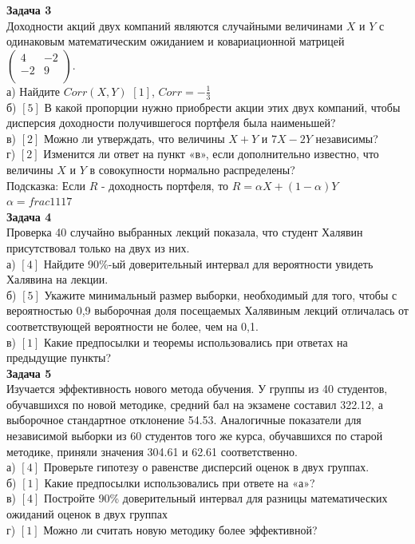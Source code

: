 \documentclass[12pt, a4paper]{article}\usepackage[]{graphicx}\usepackage[]{color}
\begin{document}
	\textbf{Задача 3} \\ %
	Доходности акций двух компаний являются случайными величинами $X$
	и $Y$ с одинаковым математическим ожиданием и ковариационной
	матрицей  $\left(%
	\begin{array}{cc}
	4 & -2 \\
	-2 & 9 \\
	\end{array}%
	\right).$ \\
	а) Найдите $Corr(X,Y)$  $[1]$, $Corr=-\frac{1}{3}$\\
	б) $[5]$ В какой пропорции нужно приобрести акции этих двух
	компаний,
	чтобы дисперсия доходности получившегося портфеля была наименьшей? \\
	в)  $[2]$ Можно ли утверждать, что величины $X+Y$ и $7X-2Y$ независимы? \\
	г) $[2]$ Изменится ли ответ на пункт «в», если дополнительно
	известно,
	что величины $X$ и $Y$ в совокупности нормально распределены? \\
	Подсказка: Если $R$ - доходность портфеля, то $R=\alpha
	X+(1-\alpha)Y$ \\
	$\alpha=frac{11}{17}$ \\

	\textbf{Задача 4} \\ %
	Проверка 40 случайно выбранных лекций показала, что студент
	Халявин присутствовал только на двух из них. \\
	а) $[4]$ Найдите 90\%-ый доверительный интервал для вероятности
	увидеть Халявина на лекции. \\
	б) $[5]$ Укажите минимальный размер выборки, необходимый для того,
	чтобы с вероятностью 0,9 выборочная доля посещаемых Халявиным
	лекций
	отличалась от соответствующей вероятности не более, чем на 0,1. \\
	в) $[1]$ Какие предпосылки и теоремы использовались при ответах на предыдущие пункты? \\


	\textbf{Задача 5} \\ %
	Изучается эффективность нового метода обучения. У группы из 40
	студентов, обучавшихся по новой методике, средний бал на экзамене
	составил 322.12, а выборочное стандартное отклонение 54.53.
	Аналогичные показатели для независимой выборки из 60 студентов
	того же курса, обучавшихся по старой методике,
	приняли значения 304.61 и 62.61 соответственно. \\
	а) $[4]$ Проверьте гипотезу о равенстве дисперсий оценок в двух
	группах.
	\\
	б) $[1]$ Какие предпосылки использовались при ответе на «а»? \\
	в) $[4]$ Постройте 90\% доверительный интервал для разницы
	математических ожиданий оценок в двух группах \\
	г) $[1]$ Можно ли считать новую методику более эффективной? \\
\end{document}
